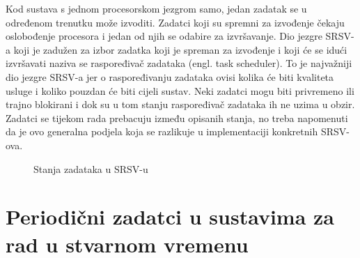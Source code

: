 \documentclass[../zavrsni.tex]{subfiles}
\begin{document}
Kod sustava s jednom procesorskom jezgrom samo, jedan zadatak se u određenom trenutku može izvoditi. Zadatci koji su spremni za izvođenje
čekaju oslobođenje procesora i jedan od njih se odabire za izvršavanje.
Dio jezgre SRSV-a koji je zadužen za izbor zadatka koji je spreman za izvođenje i koji će se idući izvršavati naziva se raspoređivač 
zadataka (engl. task scheduler). To je najvažniji dio jezgre SRSV-a jer o raspoređivanju zadataka ovisi kolika će biti kvaliteta usluge i
koliko pouzdan će biti cijeli sustav.
Neki zadatci mogu biti privremeno ili trajno blokirani i dok su u tom stanju raspoređivač zadataka ih ne uzima u obzir.
Zadatci se tijekom rada prebacuju između opisanih stanja, no treba napomenuti da je ovo generalna podjela koja se razlikuje u 
implementaciji konkretnih SRSV-ova.

\begin{figure}[!htb]
    \caption{\label{fig:my-label} Stanja zadataka u SRSV-u}
  \end{figure}

\section{Periodični zadatci u sustavima za rad u stvarnom vremenu}
\end{document}
